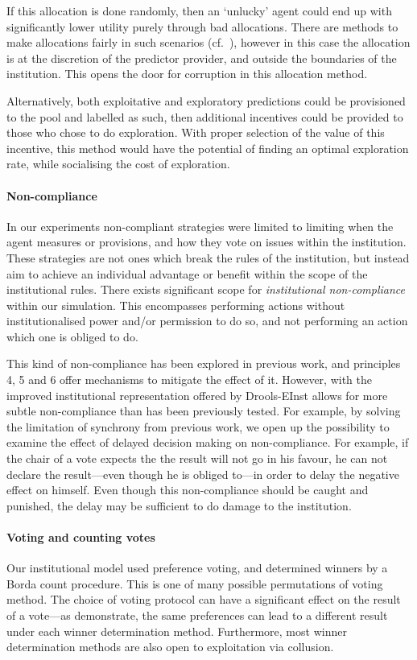 If this allocation is done randomly, then an `unlucky' agent could end up with
significantly lower utility purely through bad allocations. There are methods
to make allocations fairly in such scenarios (cf.~\citet{Pitt2014}), however
in this case the allocation is at the discretion of the predictor provider,
and outside the boundaries of the institution. This opens the door for
corruption in this allocation method.

Alternatively, both exploitative and exploratory predictions could be
provisioned to the pool and labelled as such, then additional incentives could
be provided to those who chose to do exploration. With proper selection of the
value of this incentive, this method would have the potential of finding an
optimal exploration rate, while socialising the cost of exploration.

\paragraph{Non-compliance} In our experiments non-compliant strategies were
limited to limiting when the agent measures or provisions, and how they vote
on issues within the institution. These strategies are not ones which break
the rules of the institution, but instead aim to achieve an individual
advantage or benefit within the scope of the institutional rules. There exists
significant scope for \emph{institutional non-compliance} within our
simulation. This encompasses performing actions without institutionalised
power and/or permission to do so, and not performing an action which one is
obliged to do.

This kind of non-compliance has been explored in previous work, and principles
4, 5 and 6 offer mechanisms to mitigate the effect of it. However, with the
improved institutional representation offered by Drools-EInst allows for more
subtle non-compliance than has been previously tested. For example, by solving
the limitation of synchrony from previous work, we open up the possibility to
examine the effect of delayed decision making on non-compliance. For example,
if the chair of a vote expects the the result will not go in his favour, he
can not declare the result---even though he is obliged to---in order to delay
the negative effect on himself. Even though this non-compliance should be
caught and punished, the delay may be sufficient to do damage to the
institution.

\paragraph{Voting and counting votes} Our institutional model used preference
voting, and determined winners by a Borda count procedure. This is one of many
possible permutations of voting method. The choice of voting protocol can have
a significant effect on the result of a vote---as \citet{Pitt2011b}
demonstrate, the same preferences can lead to a different result under each
winner determination method. Furthermore, most winner determination methods
are also open to exploitation via collusion.

